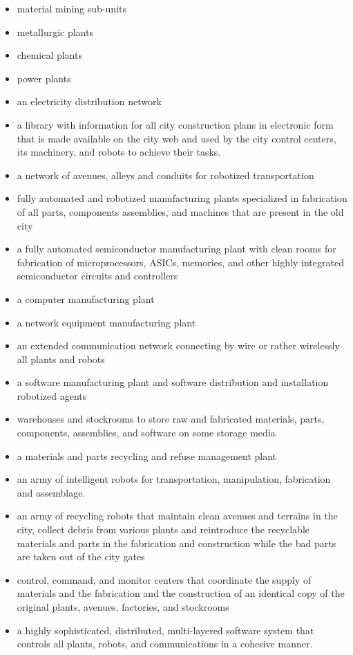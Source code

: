 \begin{itemize}
\item material mining sub-units 
\item metallurgic plants
\item chemical plants
\item power plants
\item an electricity distribution network
\item a library with information for all city construction plans in
electronic form that is made available on the city web and used by the
city control centers, its machinery, and robots to achieve their tasks.
\item a network of avenues, alleys and conduits for robotized
transportation
\item fully automated and robotized manufacturing plants specialized in
fabrication of all parts, components assemblies, and machines that are
present in the old city
\item a fully automated semiconductor manufacturing plant with clean
rooms for fabrication of microprocessors, ASICs, memories, and other
highly integrated semiconductor circuits and controllers
\item a computer manufacturing plant
\item a network equipment manufacturing plant
\item an extended communication network connecting by wire or rather
wirelessly all plants and robots
\item a software manufacturing plant and software distribution and
installation robotized agents
\item warehouses and stockrooms to store raw and fabricated materials,
parts, components, assemblies, and software on some storage media
\item a materials and parts recycling and refuse management plant
\item an army of intelligent robots for transportation, manipulation,
fabrication and assemblage.
\item an army of recycling robots that maintain clean avenues and
terrains in the city, collect debris from various plants and
reintroduce the recyclable materials and parts in the fabrication and
construction while the bad parts are taken out of the city gates
\item control, command, and monitor centers that coordinate the supply of
materials and the fabrication and the construction of an identical copy of
the original plants, avenues, factories, and stockrooms
\item a highly sophisticated, distributed, multi-layered software system
that controls all plants, robots, and communications in a cohesive
manner.
\end{itemize}


